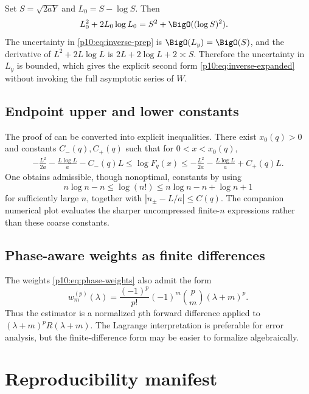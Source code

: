 \documentclass[11pt]{article}
\numberwithin{equation}{section}
\theoremstyle{definition}
\theoremstyle{remark}
\begin{document}
Set $S=\sqrt{2aY}$ and $L_0=S-\log S$.  Then
\begin{align*}
 L_0^2+2L_0\log L_0
 &=S^2+\BigO((\log S)^2).
\end{align*}
The uncertainty in \eqref{p10:eq:inverse-prep} is $\BigO(L_y)=\BigO(S)$, and the derivative of
$L^2+2L\log L$ is $2L+2\log L+2\asymp S$.  Therefore the uncertainty in $L_y$ is bounded,
which gives the explicit second form \eqref{p10:eq:inverse-expanded} without invoking the full
asymptotic series of $W$.

\subsection{Endpoint upper and lower constants}

The proof of  can be converted into explicit inequalities.  There exist
$x_0(q)>0$ and constants $C_-(q),C_+(q)$ such that for $0<x<x_0(q)$,
\begin{align*}
 -\frac{L^2}{2a}-\frac{L\log L}{a}-C_-(q)L
 \le\log F_q(x)
 \le-\frac{L^2}{2a}-\frac{L\log L}{a}+C_+(q)L.
\end{align*}
One obtains admissible, though nonoptimal, constants by using
\[
 n\log n-n\le\log(n!)\le n\log n-n+\log n+1
\]
for sufficiently large $n$, together with
$|n_\pm-L/a|\le C(q)$.  The companion numerical plot evaluates the sharper uncompressed
finite-$n$ expressions rather than these coarse constants.

\subsection{Phase-aware weights as finite differences}

The weights \eqref{p10:eq:phase-weights} also admit the form
\[
 w_m^{(p)}(\lambda)
 =\frac{(-1)^p}{p!}(-1)^m\binom pm(\lambda+m)^p.
\]
Thus the estimator is a normalized $p$th forward difference applied to
$(\lambda+m)^pR(\lambda+m)$.  The Lagrange interpretation is preferable for error analysis,
but the finite-difference form may be easier to formalize algebraically.

\section{Reproducibility manifest}
\label{p10:app:manifest}
\end{document}
